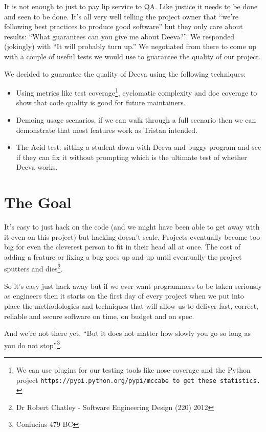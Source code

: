 \documentclass[11pt, a4paper]{article}
\begin{document}
It is not enough to just to pay lip service to QA. Like justice it needs to be done and seen to be done. It's all very well telling the project owner that ``we're following best practices to produce good software'' but they only care about results: ``What guarantees can you give me about Deeva?''. We responded (jokingly) with ``It will probably turn up.'' We negotiated from there to come up with a couple of useful tests we would use to guarantee the quality of our project.

We decided to guarantee the quality of Deeva using the following techniques: 
\begin{itemize}
\item
Using metrics like test coverage\footnote{ We can use plugins for our testing tools like nose-coverage and the Python project \tt{https://pypi.python.org/pypi/mccabe to get these statistics.
}}, cyclomatic complexity and doc coverage to show that code quality is good for future maintainers.
\item
Demoing usage scenarios, if we can walk through a full scenario then we can demonstrate that most features work as Tristan intended.
\item
The Acid test: sitting a student down with Deeva and buggy program and see if they can fix it without prompting which is the ultimate test of whether Deeva works. 

\end{itemize}

\section{The Goal}

It's easy to just hack on the code (and we might have been able to get away with it even on this project) but hacking doesn't scale. Projects eventually become too big for even the cleverest person to fit in their head all at once. The cost of adding a feature or fixing a bug goes up and up until eventually the project sputters and dies\footnote{ Dr Robert Chatley - Software Engineering Design (220) 2012}.

So it's easy just hack away but if we ever want programmers to be taken seriously as engineers then it starts on the first day of every project when we put into place the methodologies and techniques that will allow us to deliver fast, correct, reliable and secure software on time, on budget and on spec.

And we're not there yet. ``But it does not matter how slowly you go so long as you do not stop''\footnote{Confucius 479 BC}.
\end{document}
